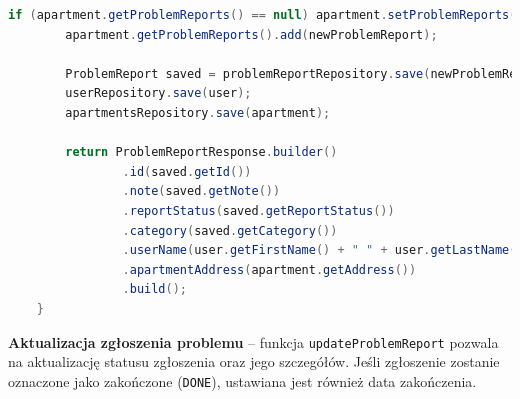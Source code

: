 \begin{lstlisting}[language=Java, style=JavaStyle, caption=Tworzenie zgłoszenia problemu.]
        if (apartment.getProblemReports() == null) apartment.setProblemReports(new ArrayList<>());
        apartment.getProblemReports().add(newProblemReport);

        ProblemReport saved = problemReportRepository.save(newProblemReport);
        userRepository.save(user);
        apartmentsRepository.save(apartment);

        return ProblemReportResponse.builder()
                .id(saved.getId())
                .note(saved.getNote())
                .reportStatus(saved.getReportStatus())
                .category(saved.getCategory())
                .userName(user.getFirstName() + " " + user.getLastName())
                .apartmentAddress(apartment.getAddress())
                .build();
    }
\end{lstlisting}

\textbf{Aktualizacja zgłoszenia problemu} -- funkcja \texttt{updateProblemReport} pozwala na aktualizację statusu zgłoszenia oraz jego szczegółów. Jeśli zgłoszenie zostanie oznaczone jako zakończone (\texttt{DONE}), ustawiana jest również data zakończenia.

